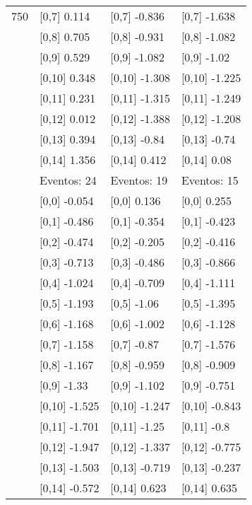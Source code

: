 \begin{table}
\begin{tabular}[t]{llll}
750 & {}[0,7] 0.114 & {}[0,7] -0.836 & {}[0,7] -1.638\\
\addlinespace
 & {}[0,8] 0.705 & {}[0,8] -0.931 & {}[0,8] -1.082\\
 & {}[0,9] 0.529 & {}[0,9] -1.082 & {}[0,9] -1.02\\
 & {}[0,10] 0.348 & {}[0,10] -1.308 & {}[0,10] -1.225\\
 & {}[0,11] 0.231 & {}[0,11] -1.315 & {}[0,11] -1.249\\
 & {}[0,12] 0.012 & {}[0,12] -1.388 & {}[0,12] -1.208\\
\addlinespace
 & {}[0,13] 0.394 & {}[0,13] -0.84 & {}[0,13] -0.74\\
 & {}[0,14] 1.356 & {}[0,14] 0.412 & {}[0,14] 0.08\\
 & Eventos:  24 & Eventos:  19 & Eventos:  15\\
 & {}[0,0] -0.054 & {}[0,0] 0.136 & {}[0,0] 0.255\\
 & {}[0,1] -0.486 & {}[0,1] -0.354 & {}[0,1] -0.423\\
\addlinespace
 & {}[0,2] -0.474 & {}[0,2] -0.205 & {}[0,2] -0.416\\
 & {}[0,3] -0.713 & {}[0,3] -0.486 & {}[0,3] -0.866\\
 & {}[0,4] -1.024 & {}[0,4] -0.709 & {}[0,4] -1.111\\
 & {}[0,5] -1.193 & {}[0,5] -1.06 & {}[0,5] -1.395\\
 & {}[0,6] -1.168 & {}[0,6] -1.002 & {}[0,6] -1.128\\
\addlinespace
1000 & {}[0,7] -1.158 & {}[0,7] -0.87 & {}[0,7] -1.576\\
 & {}[0,8] -1.167 & {}[0,8] -0.959 & {}[0,8] -0.909\\
 & {}[0,9] -1.33 & {}[0,9] -1.102 & {}[0,9] -0.751\\
 & {}[0,10] -1.525 & {}[0,10] -1.247 & {}[0,10] -0.843\\
 & {}[0,11] -1.701 & {}[0,11] -1.25 & {}[0,11] -0.8\\
\addlinespace
 & {}[0,12] -1.947 & {}[0,12] -1.337 & {}[0,12] -0.775\\
 & {}[0,13] -1.503 & {}[0,13] -0.719 & {}[0,13] -0.237\\
 & {}[0,14] -0.572 & {}[0,14] 0.623 & {}[0,14] 0.635\\
\bottomrule
\end{tabular}
\end{table}
